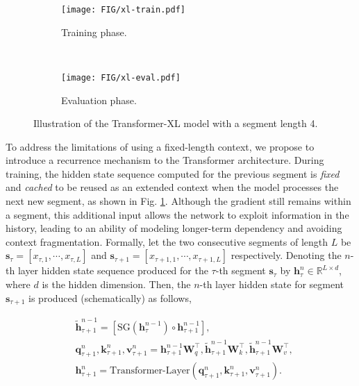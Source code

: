 \documentclass[11pt,a4paper]{article}
\def\rvh{{\mathbf{h}}}
\def\rvk{{\mathbf{k}}}
\def\rvq{{\mathbf{q}}}
\def\rvs{{\mathbf{s}}}
\def\rvv{{\mathbf{v}}}
\def\rmW{{\mathbf{W}}}
\newcommand{\R}{\mathbb{R}}
\newcommand{\rulesep}{\unskip\ \vrule\ }
\begin{document}
\begin{figure*}[!h]
	\begin{subfigure}[b]{0.62\linewidth}
		\texttt{[image: FIG/xl-train.pdf]}
		\caption{\small Training phase.}
		\label{fig:xl-train}
	\end{subfigure}
	\rulesep
	\begin{subfigure}[b]{0.35\linewidth}
		\texttt{[image: FIG/xl-eval.pdf]}
		\caption{\small Evaluation phase.}
		\label{fig:xl-eval}
	\end{subfigure}
	\caption{\small Illustration of the Transformer-XL model with a segment length 4.}
	\label{fig:xl}
\vspace{-1em}
\end{figure*}
To address the limitations of using a fixed-length context, we propose to introduce a recurrence mechanism to the Transformer architecture.
During training, the hidden state sequence computed for the previous segment is \textit{fixed} and \textit{cached} to be reused as an extended context when the model processes the next new segment, as shown in Fig. \ref{fig:xl-train}.
Although the gradient still remains within a segment, this additional input allows the network to exploit information in the history, leading to an ability of modeling longer-term dependency and avoiding context fragmentation.
Formally, let the two consecutive segments of length $L$ be $\rvs_{\tau} = \left[x_{\tau,1}, \cdots, x_{\tau,L}\right]$ and $\rvs_{\tau+1} = \left[x_{\tau+1,1}, \cdots, x_{\tau+1,L}\right]$ respectively.
Denoting the $n$-th layer hidden state sequence produced for the $\tau$-th segment $\rvs_{\tau}$ by $\rvh_{\tau}^{n} \in \R^{L \times d}$, where $d$ is the hidden dimension.
Then, the $n$-th layer hidden state for segment $\rvs_{\tau+1}$ is produced (schematically) as follows,
\par\nobreak
\vspace{-0.5em}
\small
\begin{align*}\label{eqn:reuse}
	&\widetilde{\rvh}_{\tau+1}^{n-1} = \left[ \text{SG}(\rvh_{\tau}^{n-1}) \circ \rvh_{\tau+1}^{n-1} \right],
\\
	&\rvq_{\tau+1}^{n}, \rvk_{\tau+1}^{n}, \rvv_{\tau+1}^{n} = \rvh_{\tau+1}^{n-1} \rmW_q^\top, \widetilde{\rvh}_{\tau+1}^{n-1} \rmW_k^\top, \widetilde{\rvh}_{\tau+1}^{n-1} \rmW_v^\top,
\\
	&\rvh_{\tau+1}^{n} = \text{Transformer-Layer}\left(\rvq_{\tau+1}^{n}, \rvk_{\tau+1}^{n}, \rvv_{\tau+1}^{n}\right).
\end{align*}
\normalsize
\vspace{-1.5em}
\end{document}
